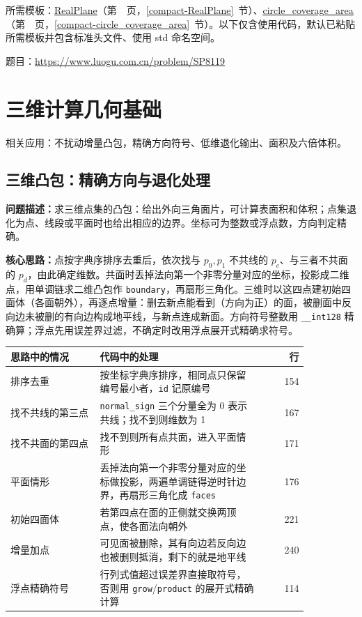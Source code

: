 所需模板：\hyperref[compact-RealPlane]{RealPlane}（第~\pageref{compact-RealPlane}~页，\ref{compact-RealPlane}~节）、\hyperref[compact-circle_coverage_area]{circle\_\allowbreak{}coverage\_\allowbreak{}area}（第~\pageref{compact-circle_coverage_area}~页，\ref{compact-circle_coverage_area}~节）。以下仅含使用代码，默认已粘贴所需模板并包含标准头文件、使用 std 命名空间。

题目：\url{https://www.luogu.com.cn/problem/SP8119}



\newpage

\chapter{三维计算几何基础}

\noindent 相关应用：不扰动增量凸包，精确方向符号、低维退化输出、面积及六倍体积。

\section{三维凸包：精确方向与退化处理}\label{compact-Hull3D}

\noindent\textbf{问题描述：}\allowbreak 求三维点集的凸包：给出外向三角面片，可计算表面积和体积；点集退化为点、线段或平面时也给出相应的边界。坐标可为整数或浮点数，方向判定精确。

\textbf{核心思路：}\allowbreak 点按字典序排序去重后，依次找与 $p_0,p_1$ 不共线的 $p_c$、与三者不共面的 $p_d$，由此确定维数。共面时丢掉法向第一个非零分量对应的坐标，投影成二维点，用单调链求二维凸包作 \texttt{boundary}，再扇形三角化。三维时以这四点建初始四面体（各面朝外），再逐点增量：删去新点能看到（方向为正）的面，被删面中反向边未被删的有向边构成地平线，与新点连成新面。方向符号整数用 \texttt{\_\_int128} 精确算；浮点先用误差界过滤，不确定时改用浮点展开式精确求符号。

\begin{center}\small
\begin{tabular}{@{}p{0.30\linewidth}p{0.55\linewidth}r@{}}
\toprule
思路中的情况 & 代码中的处理 & 行\\
\midrule
排序去重 & 按坐标字典序排序，相同点只保留编号最小者，\texttt{id} 记原编号 & 154\\
找不共线的第三点 & \texttt{normal\_sign} 三个分量全为 0 表示共线；找不到则维数为 1 & 167\\
找不共面的第四点 & 找不到则所有点共面，进入平面情形 & 171\\
平面情形 & 丢掉法向第一个非零分量对应的坐标做投影，两遍单调链得逆时针边界，再扇形三角化成 \texttt{faces} & 176\\
初始四面体 & 若第四点在面的正侧就交换两顶点，使各面法向朝外 & 221\\
增量加点 & 可见面被删除，其有向边若反向边也被删则抵消，剩下的就是地平线 & 240\\
浮点精确符号 & 行列式值超过误差界直接取符号，否则用 \texttt{grow}/\texttt{product} 的展开式精确计算 & 114\\
\bottomrule
\end{tabular}
\end{center}



